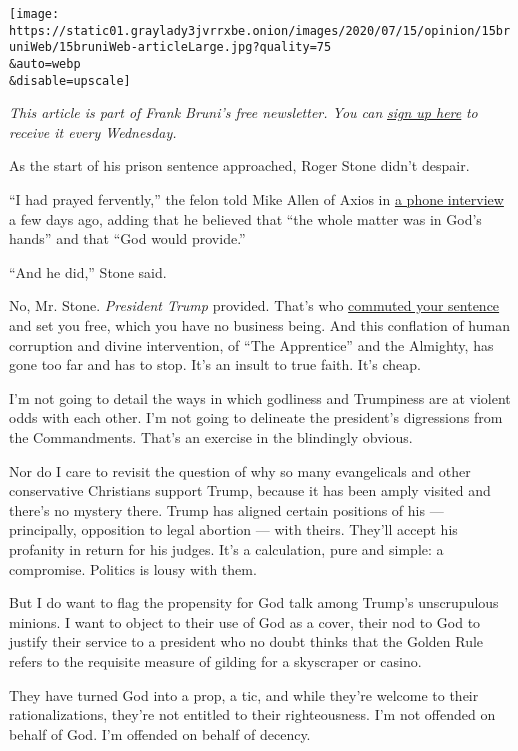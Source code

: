 \texttt{[image: https://static01.graylady3jvrrxbe.onion/images/2020/07/15/opinion/15bruniWeb/15bruniWeb-articleLarge.jpg?quality=75\\\&auto=webp\\\&disable=upscale]}

\emph{This article is part of Frank Bruni's free newsletter. You can}
\href{https://www.nytimes3xbfgragh.onion/newsletters/frank-bruni}{\emph{sign
up here}} \emph{to receive it every Wednesday.}

As the start of his prison sentence approached, Roger Stone didn't
despair.

``I had prayed fervently,'' the felon told Mike Allen of Axios in
\href{https://www.axios.com/roger-stone-interview-campaign-trump-37b8e1d9-cd72-47ea-8401-801b99d1ea0f.html}{a
phone interview} a few days ago, adding that he believed that ``the
whole matter was in God's hands'' and that ``God would provide.''

``And he did,'' Stone said.

No, Mr. Stone. \emph{President Trump} provided. That's who
\href{https://www.nytimes3xbfgragh.onion/2020/07/10/us/politics/trump-roger-stone-clemency.html}{commuted
your sentence} and set you free, which you have no business being. And
this conflation of human corruption and divine intervention, of ``The
Apprentice'' and the Almighty, has gone too far and has to stop. It's an
insult to true faith. It's cheap.

I'm not going to detail the ways in which godliness and Trumpiness are
at violent odds with each other. I'm not going to delineate the
president's digressions from the Commandments. That's an exercise in the
blindingly obvious.

Nor do I care to revisit the question of why so many evangelicals and
other conservative Christians support Trump, because it has been amply
visited and there's no mystery there. Trump has aligned certain
positions of his --- principally, opposition to legal abortion --- with
theirs. They'll accept his profanity in return for his judges. It's a
calculation, pure and simple: a compromise. Politics is lousy with them.

But I do want to flag the propensity for God talk among Trump's
unscrupulous minions. I want to object to their use of God as a cover,
their nod to God to justify their service to a president who no doubt
thinks that the Golden Rule refers to the requisite measure of gilding
for a skyscraper or casino.

They have turned God into a prop, a tic, and while they're welcome to
their rationalizations, they're not entitled to their righteousness. I'm
not offended on behalf of God. I'm offended on behalf of decency.

